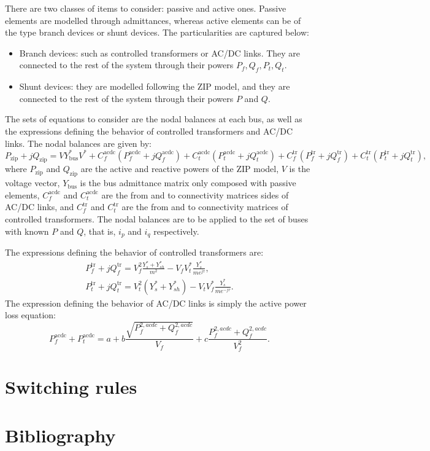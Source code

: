 \documentclass[11pt]{article}
\begin{document}
There are two classes of items to consider: passive and active ones. Passive elements are modelled through admittances, whereas active elements can be of the type branch devices or shunt devices. The particularities are captured below:
\begin{itemize}
	\item Branch devices: such as controlled transformers or AC/DC links. They are connected to the rest of the system through their powers $P_f, Q_f, P_t, Q_t$. 
	\item Shunt devices: they are modelled following the ZIP model, and they are connected to the rest of the system through their powers $P$ and $Q$.
\end{itemize}
The sets of equations to consider are the nodal balances at each bus, as well as the expressions defining the behavior of controlled transformers and AC/DC links. The nodal balances are given by:
\begin{equation}
	P_\text{zip}+jQ_\text{zip} = VY^*_\text{bus}V^* + C_f^\text{acdc}(P^\text{acdc}_f + jQ^\text{acdc}_f) + C_t^\text{acdc}(P^\text{acdc}_t + jQ^\text{acdc}_t) + C_f^\text{tr}(P^\text{tr}_f + jQ^\text{tr}_f) + C_t^\text{tr}(P^\text{tr}_t + jQ^\text{tr}_t),
\end{equation}
where $P_\text{zip}$ and $Q_\text{zip}$ are the active and reactive powers of the ZIP model, $V$ is the voltage vector, $Y_\text{bus}$ is the bus admittance matrix only composed with passive elements, $C_f^\text{acdc}$ and $C_t^\text{acdc}$ are the from and to connectivity matrices sides of AC/DC links, and $C_f^\text{tr}$ and $C_t^\text{tr}$ are the from and to connectivity matrices of controlled transformers. The nodal balances are to be applied to the set of buses with known $P$ and $Q$, that is, ${i}_p$ and ${i}_q$ respectively.

The expressions defining the behavior of controlled transformers are:
\begin{equation}
	\begin{aligned}
		P_f^\text{tr} + jQ_f^\text{tr} = V_f^2 \frac{Y_s^* + Y_{sh}^*}{m^2} - V_fV_t^*\frac{Y_s^*}{me^{j\tau}}, \\
		P_t^\text{tr} + jQ_t^\text{tr} = V_t^2 (Y_s^* + Y_{sh}^*) - V_tV_f^*\frac{Y_s^*}{me^{-j\tau}}.
	\end{aligned}
\end{equation}
The expression defining the behavior of AC/DC links is simply the active power loss equation:
\begin{equation}
	P_f^\text{acdc} + P_t^\text{acdc} = a + b\frac{\sqrt{P_f^{2,acdc} + Q_f^{2,acdc}}}{V_f} + c\frac{P_f^{2,acdc} + Q_f^{2,acdc}}{V_f^2}.	
\end{equation}


\section{Switching rules}

	
\section{Bibliography}
	\printbibliography
	
\end{document}
